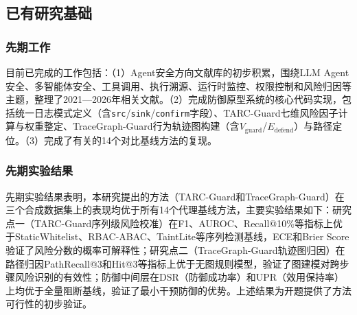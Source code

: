 \subsection{已有研究基础}
\subsubsection{先期工作}

目前已完成的工作包括：（1）Agent安全方向文献库的初步积累，围绕LLM Agent安全、多智能体安全、工具调用、执行溯源、运行时监控、权限控制和风险归因等主题，整理了2021—2026年相关文献。（2）完成防御原型系统的核心代码实现，包括统一日志模式定义（含\texttt{src}/\texttt{sink}/\texttt{confirm}字段）、TARC-Guard七维风险因子计算与权重整定、TraceGraph-Guard行为轨迹图构建（含$V_{\text{guard}}$/$E_{\text{defend}}$）与路径定位。（3）完成了有关的14个对比基线方法的复现。

\subsubsection{先期实验结果}

先期实验结果表明，本研究提出的方法（TARC-Guard和TraceGraph-Guard）在三个合成数据集上的表现均优于所有14个代理基线方法，主要实验结果如下：研究点一（TARC-Guard序列级风险校准）在F1、AUROC、Recall@10\%等指标上优于StaticWhitelist、RBAC-ABAC、TaintLite等序列检测基线，ECE和Brier Score验证了风险分数的概率可解释性；研究点二（TraceGraph-Guard轨迹图归因）在路径归因PathRecall@3和Hit@3等指标上优于无图规则模型，验证了图建模对跨步骤风险识别的有效性；防御中间层在DSR（防御成功率）和UPR（效用保持率）上均优于全量阻断基线，验证了最小干预防御的优势。上述结果为开题提供了方法可行性的初步验证。
